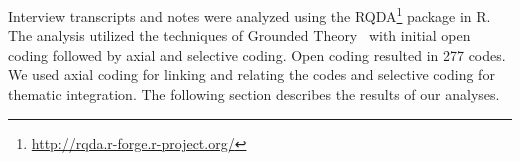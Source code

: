 Interview transcripts and notes were analyzed using the RQDA\footnote{\url{http://rqda.r-forge.r-project.org/}} package in R. The analysis utilized the techniques of Grounded Theory~\cite{glaser1968discovery} with initial open coding followed by axial and selective coding. Open coding resulted in 277 codes. We used axial coding for linking and relating the codes and selective coding for thematic integration. The following section describes the results of our analyses.
